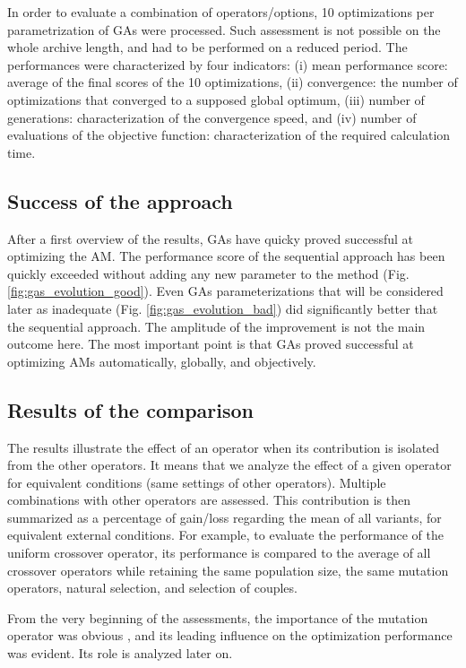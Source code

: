 \documentclass{ametsoc}
\begin{document}
In order to evaluate a combination of operators/options, 10 optimizations per parametrization of GAs were processed. Such assessment is not possible on the whole archive length, and had to be performed on a reduced period. The performances were characterized by four indicators: (i) mean performance score: average of the final scores of the 10 optimizations, (ii) convergence: the number of optimizations that converged to a supposed global optimum, (iii) number of generations: characterization of the convergence speed, and (iv) number of evaluations of the objective function: characterization of the required calculation time.


\subsection{Success of the approach}

After a first overview of the results, GAs have quicky proved successful at optimizing the AM. The performance score of the sequential approach has been quickly exceeded without adding any new parameter to the method (Fig. \ref{fig:gas_evolution_good}). Even GAs parameterizations that will be considered later as inadequate (Fig. \ref{fig:gas_evolution_bad}) did significantly better that the sequential approach. The amplitude of the improvement is not the main outcome here. The most important point is that GAs proved successful at optimizing AMs automatically, globally, and objectively.


\subsection{Results of the comparison}

The results illustrate the effect of an operator when its contribution is isolated from the other operators. It means that we analyze the effect of a given operator for equivalent conditions (same settings of other operators). Multiple combinations with other operators are assessed. This contribution is then summarized as a percentage of gain/loss regarding the mean of all variants, for equivalent external conditions. For example, to evaluate the performance of the uniform crossover operator, its performance is compared to the average of all crossover operators while retaining the same population size, the same mutation operators, natural selection, and selection of couples.

From the very beginning of the assessments, the importance of the mutation operator was obvious \cite[see][for the details]{Horton2012a}, and its leading influence on the optimization performance was evident. Its role is analyzed later on.
\end{document}
